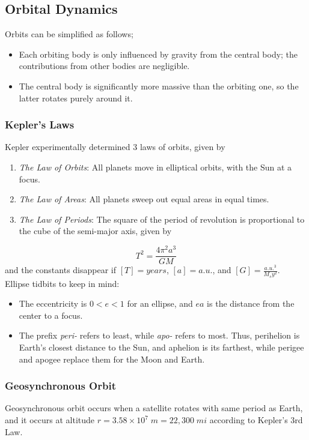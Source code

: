 \documentclass[../PhysicsFormulae.tex]{subfiles}
\begin{document}
\subsection{Orbital Dynamics}
Orbits can be simplified as follows;
\begin{itemize}
\item Each orbiting body is only influenced by gravity from the central body; the contributions from other bodies are negligible. 
\item The central body is significantly more massive than the orbiting one, so the latter rotates purely around it. 
\end{itemize}
\subsubsection{Kepler's Laws}
Kepler experimentally determined 3 laws of orbits, given by
\begin{enumerate}
\item \textit{The Law of Orbits}: All planets move in elliptical orbits, with the Sun at a focus. 
\item \textit{The Law of Areas}: All planets sweep out equal areas in equal times. 
\item \textit{The Law of Periods}: The square of the period of revolution is proportional to the cube of the semi-major axis, given by
\end{enumerate}
\[ T^2 = \frac{4\pi^2 a^3}{GM} \]
and the constants disappear if $[T] = years$, $[a] = a.u.$, and $[G] = \frac{{a.u.}^3}{M_s y^2}$. \\
Ellipse tidbits to keep in mind: 
\begin{itemize}
\item The eccentricity is $0<e<1$ for an ellipse, and $ea$ is the distance from the center to a focus.
\item The prefix \textit{peri-} refers to least, while \textit{apo-} refers to most. Thus, perihelion is Earth's closest distance to the Sun, and aphelion is its farthest, while perigee and apogee replace them for the Moon and Earth. 
\end{itemize}

\subsubsection{Geosynchronous Orbit}
Geosynchronous orbit occurs when a satellite rotates with same period as Earth, and it occurs at altitude $r = 3.58 \times 10^7 \; m = 22,300 \; mi$ according to Kepler's 3rd Law. 
\end{document}
